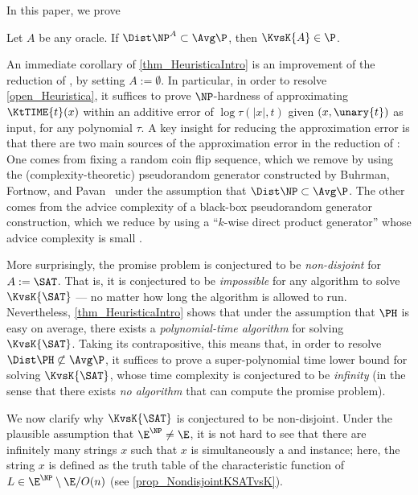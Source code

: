 \documentclass{toc}
\begin{document}
In this paper, we prove
%
\begin{theorem}
  \label{thm_HeuristicaIntro}
  Let $A$ be any oracle.
  If $\Dist\NP^A \subset \Avg\P$,
  then
  $\KvsK{A} \in \P$.
\end{theorem}

An immediate corollary of \cref{thm_HeuristicaIntro} is an improvement of the reduction of \cite{Hirahara18_focs_conf}, by setting $A := \emptyset$.
In particular, in order to resolve \cref{open_Heuristica},
it suffices to prove $\NP$-hardness of approximating $\KtTIME{t}(x)$ within an additive error of $\log \tau(|x|, t)$ given $(x, \unary{t})$ as input, for any polynomial $\tau$.
A key insight for reducing the approximation error is
that there are two main sources of the approximation error in the reduction of \cite{Hirahara18_focs_conf}:
One comes from fixing a random coin flip sequence,
which we remove by using the (complexity-theoretic) pseudorandom generator
constructed by
Buhrman, Fortnow, and Pavan~\cite{BuhrmanFP05_mst_journals}
under the assumption that $\Dist\NP \subset \Avg\P$.
The other comes from
the advice complexity of a black-box pseudorandom generator construction,
which we reduce by using
a ``$k$-wise direct product generator''
whose advice complexity is small \cite{Hirahara20_stoc_conf}.
%
%
%

More surprisingly,
the promise problem is conjectured to be \emph{non-disjoint} for $A := \SAT$.
That is, it is conjectured to be \emph{impossible} for any algorithm to solve $\KvsK{\SAT}$ --- no matter how long the algorithm is allowed to run.
Nevertheless,
\cref{thm_HeuristicaIntro}
shows that
under the assumption that $\PH$ is easy on average,
there exists a \emph{polynomial-time algorithm} for solving $\KvsK{\SAT}$.
Taking its contrapositive,
this means that,
in order to resolve $\Dist\PH \not\subset \Avg\P$,
it suffices to prove a super-polynomial time lower bound
for solving $\KvsK{\SAT}$,
whose time complexity is conjectured to be \emph{infinity} (in the sense that there exists \emph{no algorithm} that can compute the promise problem).

We now clarify why $\KvsK{\SAT}$ is conjectured to be non-disjoint.
Under the plausible assumption that $\E^\NP \neq \E$,
it is not hard to see that
there are infinitely many strings $x$ such that $x$ is simultaneously a \Yes and \No instance;
here, the string $x$ is defined as the truth table of the characteristic function of $L \in \E^\NP \setminus \E/O(n)$
(see \cref{prop_NondisjointKSATvsK}).
\end{document}
